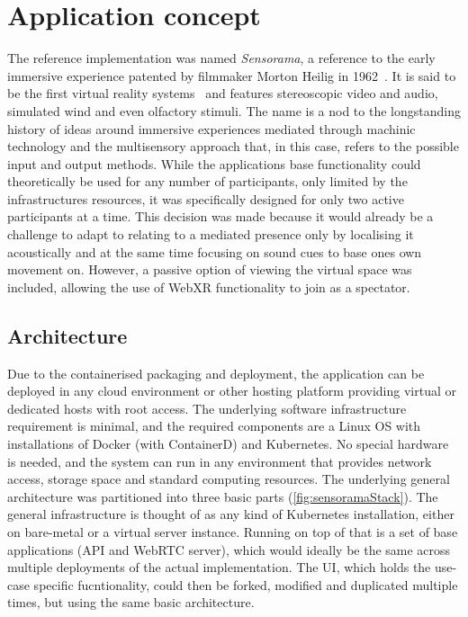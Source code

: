 \chapter{Application concept}
\label{ch:concept}

The reference implementation was named \emph{Sensorama}, a reference to the early immersive experience patented by filmmaker Morton Heilig in 1962~\parencite{Heilig_1962}.
It is said to be the first virtual reality systems~\parencite[5][]{vrHistoryGigante} and features stereoscopic video and audio, simulated wind and even olfactory stimuli.
The name is a nod to the longstanding history of ideas around immersive experiences mediated through machinic technology and the multisensory approach that, in this case, refers to the possible input and output methods.
While the application\textquotesingle s base functionality could theoretically be used for any number of participants, only limited by the infrastructure\textquotesingle s resources, it was specifically designed for only two active participants at a time.
This decision was made because it would already be a challenge to adapt to relating to a mediated presence only by localising it acoustically and at the same time focusing on sound cues to base one\textquotesingle s own movement on.
However, a passive option of viewing the virtual space was included, allowing the use of \ac{WebXR} functionality to join as a spectator.

\section{Architecture}
\label{sec:architecture}

Due to the containerised packaging and deployment, the application can be deployed in any cloud environment or other hosting platform providing virtual or dedicated hosts with root access.
The underlying software infrastructure requirement is minimal, and the required components are a Linux \ac{OS} with installations of Docker (with ContainerD) and Kubernetes.
No special hardware is needed, and the system can run in any environment that provides network access, storage space and standard computing resources.
The underlying general architecture was partitioned into three basic parts (\autoref{fig:sensoramaStack}).
The general infrastructure is thought of as any kind of Kubernetes installation, either on bare-metal or a virtual server instance.
Running on top of that is a set of base applications (\ac{API} and \ac{WebRTC} server), which would ideally be the same across multiple deployments of the actual implementation.
The \ac{UI}, which holds the use-case specific fucntionality, could then be forked, modified and duplicated multiple times, but using the same basic architecture.

